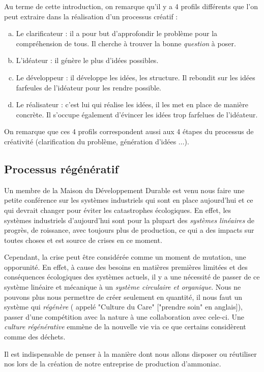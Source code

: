 Au terme de cette introduction, on remarque qu'il y a 4 profils différents que l'on peut extraire dans la réalisation d'un processus créatif :
\begin{enumerate}[(a)]
\item Le clarificateur : il a pour but d'approfondir le problème pour la compréhension de tous. Il cherche à trouver la bonne \textit{question} à poser.
\item L'idéateur : il génère le plus d'idées possibles.
\item Le développeur : il développe les idées, les structure. Il rebondit sur les idées farfeules de l'idéateur pour les rendre possible.
\item Le réalisateur : c'est lui qui réalise les idées, il les met en place de manière concrète. Il s'occupe également d'évincer les idées trop farfelues de l'idéateur.
\end{enumerate}

On remarque que ces 4 profils correspondent aussi aux 4 étapes du processus de créativité (clarification du problème, génération d'idées ...).

\subsection{Processus régénératif}
Un membre de la Maison du Développement Durable est venu nous faire une petite conférence sur les systèmes industriels qui sont en place aujourd'hui et ce qui devrait changer pour éviter les catastrophes écologiques. En effet, les systèmes industriels d'aujourd'hui sont pour la plupart des \textit{systèmes linéaires} de progrès, de roissance, avec toujours plus de production, ce qui a des impacts sur toutes choses et est source de crises en ce moment.

Cependant, la crise peut être considérée comme un moment de mutation, une opporunité. En effet, à cause des besoins en matières premières limitées et des conséquences écologiques des systèmes actuels, il y a une nécessité de passer de ce système linéaire et mécanique à un \textit{système circulaire et organique}. Nous ne pouvons plus nous permettre de créer seulement en quantité, il nous faut un système qui \textit{régénère} ( appelé "Culture du Care" ["prendre soin" en anglais]), passer d'une compétition avec la nature à une collaboration avec cele-ci. Une \textit{culture régénérative} emmène de la nouvelle vie via ce que certains considèrent comme des déchets.

Il est indispensable de penser à la manière dont nous allons disposer ou réutiliser nos lors de la création de notre entreprise de production d'ammoniac.

